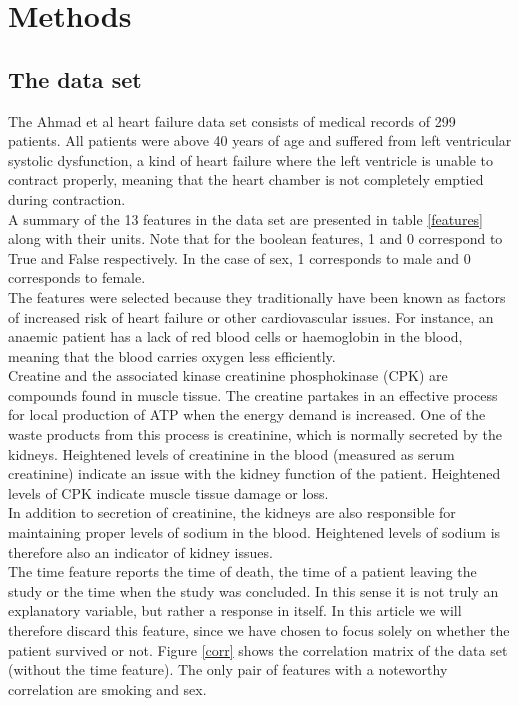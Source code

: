 \documentclass[notitlepage, reprint, nofootinbib]{revtex4-1}
\begin{document}
\section{Methods}
\subsection{The data set}
The Ahmad et al heart failure data set consists of medical records of 299 patients. All patients were above 40 years of age and suffered from left ventricular systolic dysfunction, a kind of heart failure where the left ventricle is unable to contract properly, meaning that the heart chamber is not completely emptied during contraction. \\[2mm]
A summary of the 13 features in the data set are presented in table \ref{features} along with their units. Note that for the boolean features, 1 and 0 correspond to True and False respectively. In the case of sex, 1 corresponds to male and 0 corresponds to female. \\[2mm]
The features were selected because they traditionally have been known as factors of increased risk of heart failure or other cardiovascular issues. For instance, an anaemic patient has a lack of red blood cells or haemoglobin in the blood, meaning that the blood carries oxygen less efficiently. \cite{Anaemia} \\[2mm]
Creatine and the associated kinase creatinine phosphokinase (CPK) are compounds found in muscle tissue. \cite{snl_kreatin} The creatine partakes in an effective process for local production of ATP when the energy demand is increased. \cite{vkm} One of the waste products from this process is creatinine, which is normally secreted by the kidneys. Heightened levels of creatinine in the blood (measured as serum creatinine) indicate an issue with the kidney function of the patient. Heightened levels of CPK indicate muscle tissue damage or loss. \cite{ML_article} \\[2mm]
In addition to secretion of creatinine, the kidneys are also responsible for maintaining proper levels of sodium in the blood. Heightened levels of sodium is therefore also an indicator of kidney issues. \cite{nyrer} \\[2mm]
The time feature reports the time of death, the time of a patient leaving the study or the time when the study was concluded. In this sense it is not truly an explanatory variable, but rather a response in itself. In this article we will therefore discard this feature, since we have chosen to focus solely on whether the patient survived or not. 
\newpage
Figure \ref{corr} shows the correlation matrix of the data set (without the time feature). The only pair of features with a noteworthy correlation are smoking and sex. 
\end{document}
